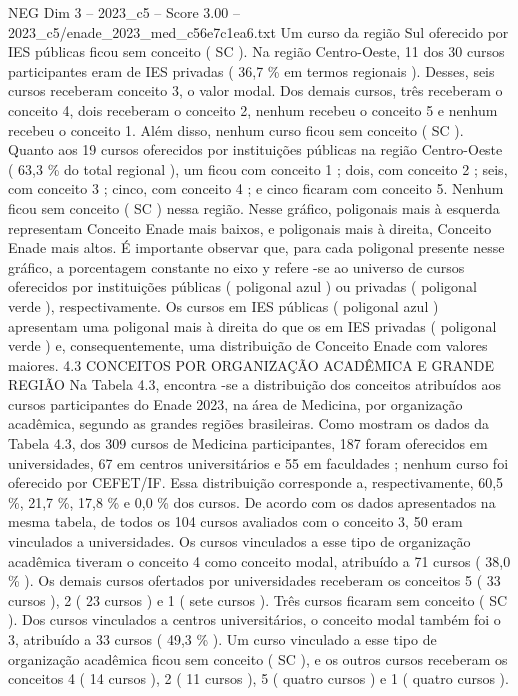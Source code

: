 \begin{textsample}{NEG Dim 3 – 2023\_c5 – Score 3.00 – 2023\_c5/enade\_2023\_med\_c56e7c1ea6.txt}
Um curso da região Sul oferecido por IES públicas ficou sem conceito ( SC ).
Na região Centro-Oeste, 11 dos 30 cursos participantes eram de IES privadas ( 36,7 \% em termos regionais ).
Desses, seis cursos receberam conceito 3, o valor modal.
Dos demais cursos, três receberam o conceito 4, dois receberam o conceito 2, nenhum recebeu o conceito 5 e nenhum recebeu o conceito 1.
Além disso, nenhum curso ficou sem conceito ( SC ).
Quanto aos 19 cursos oferecidos por instituições públicas na região Centro-Oeste ( 63,3 \% do total regional ), um ficou com conceito 1 ; dois, com conceito 2 ; seis, com conceito 3 ; cinco, com conceito 4 ; e cinco ficaram com conceito 5.
Nenhum ficou sem conceito ( SC ) nessa região.
Nesse gráfico, poligonais mais à esquerda representam Conceito Enade mais baixos, e poligonais mais à direita, Conceito Enade mais altos.
É importante observar que, para cada poligonal presente nesse gráfico, a porcentagem constante no eixo y refere -se ao universo de cursos oferecidos por instituições públicas ( poligonal azul ) ou privadas ( poligonal verde ), respectivamente.
Os cursos em IES públicas ( poligonal azul ) apresentam uma poligonal mais à direita do que os em IES privadas ( poligonal verde ) e, consequentemente, uma distribuição de Conceito Enade com valores maiores. 4.3 CONCEITOS POR ORGANIZAÇÃO ACADÊMICA E GRANDE REGIÃO Na Tabela 4.3, encontra -se a distribuição dos conceitos atribuídos aos cursos participantes do Enade 2023, na área de Medicina, por organização acadêmica, segundo as grandes regiões brasileiras.
Como mostram os dados da Tabela 4.3, dos 309 cursos de Medicina participantes, 187 foram oferecidos em universidades, 67 em centros universitários e 55 em faculdades ; nenhum curso foi oferecido por CEFET/IF.
Essa distribuição corresponde a, respectivamente, 60,5 \%, 21,7 \%, 17,8 \% e 0,0 \% dos cursos.
De acordo com os dados apresentados na mesma tabela, de todos os 104 cursos avaliados com o conceito 3, 50 eram vinculados a universidades.
Os cursos vinculados a esse tipo de organização acadêmica tiveram o conceito 4 como conceito modal, atribuído a 71 cursos ( 38,0 \% ).
Os demais cursos ofertados por universidades receberam os conceitos 5 ( 33 cursos ), 2 ( 23 cursos ) e 1 ( sete cursos ).
Três cursos ficaram sem conceito ( SC ).
Dos cursos vinculados a centros universitários, o conceito modal também foi o 3, atribuído a 33 cursos ( 49,3 \% ).
Um curso vinculado a esse tipo de organização acadêmica ficou sem conceito ( SC ), e os outros cursos receberam os conceitos 4 ( 14 cursos ), 2 ( 11 cursos ), 5 ( quatro cursos ) e 1 ( quatro cursos ).

\end{textsample}
